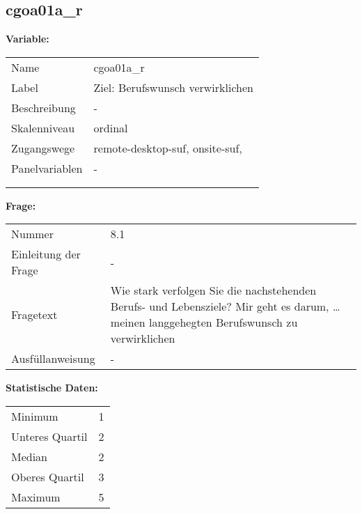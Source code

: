 	
	
	\subsection{cgoa01a\_r}
	\label{subSection:cgoa01a_r}

	\noindent\textbf{Variable:}\\
		\begin{tabular}{lL{11.3cm}}
			\label{tableVariable:cgoa01a_r}
			Name & cgoa01a\_r \\
			Label & Ziel: Berufswunsch verwirklichen \\
			Beschreibung & - \\
			Skalenniveau & ordinal \\
			Zugangswege &
				remote-desktop-suf,
				onsite-suf,
 \\
			Panelvariablen & -
			 \\
			 \\
 \\
		\end{tabular}

		\vspace*{1 cm}
		\noindent\textbf{Frage:}\\
		\begin{tabular}{lL{11.3cm}}
			\label{tableQuestion:cgoa01a_r}
			Nummer & 8.1 \\
			Einleitung der Frage & - \\
			Fragetext & Wie stark verfolgen Sie die nachstehenden Berufs- und Lebensziele?
Mir geht es darum, …
meinen langgehegten Berufswunsch zu verwirklichen \\
			Ausfüllanweisung & - \\
		\end{tabular}


		\vspace*{1 cm}
		\noindent\textbf{Statistische Daten:}\\
			\begin{tabular}{ll}
				\label{tableStatistics:cgoa01a_r}
					Minimum & 1 \\
					Unteres Quartil & 2 \\
					Median & 2 \\
					Oberes Quartil & 3 \\
					Maximum & 5 \\
			\end{tabular}



